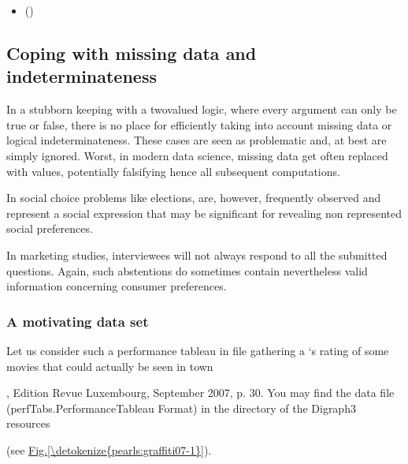 \documentclass[a4paper,12pt,english]{sphinxhowto}
\begin{document}
\begin{sphinxcontents}
\begin{itemize}
\item {} 
\sphinxAtStartPar
{}\label{\detokenize{pearls:id144}}{\hyperref[\detokenize{pearls:consensus-quality-of-the-bipolar-valued-outranking-relation}]{}} ()

\end{itemize}
\end{sphinxcontents}


\subsection{Coping with missing data and indeterminateness}
\label{\detokenize{pearls:coping-with-missing-data-and-indeterminateness}}\label{\detokenize{pearls:copingmissing-data-label}}
\sphinxAtStartPar
In a stubborn keeping with a two\sphinxhyphen{}valued logic, where every argument can only be true or false, there is no place for efficiently taking into account missing data or logical indeterminateness. These cases are seen as problematic and, at best are simply ignored. Worst, in modern data science, missing data get often replaced with  values, potentially falsifying hence all subsequent computations.

\sphinxAtStartPar
In social choice problems like elections,  are, however, frequently observed and represent a social expression that may be significant for revealing non represented social preferences.

\sphinxAtStartPar
In marketing studies, interviewees will not always respond to all the submitted questions. Again, such abstentions do sometimes contain nevertheless valid information concerning consumer preferences.


\subsubsection{A motivating data set}
\label{\detokenize{pearls:a-motivating-data-set}}
\sphinxAtStartPar
Let us consider such a performance tableau in file  gathering a  ‘s rating of some movies that could actually be seen in town %
\begin{footnote}[1]\sphinxAtStartFootnote
{}, Edition Revue Luxembourg, September 2007, p. 30. You may find the data file  (perfTabs.PerformanceTableau Format) in the  directory of the Digraph3 resources
%
\end{footnote} (see \hyperref[\detokenize{pearls:graffiti07-1}]{Fig.\@ \ref{\detokenize{pearls:graffiti07-1}}}).
\end{document}
